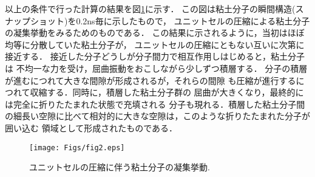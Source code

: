 以上の条件で行った計算の結果を図\ref{fig:fig2}に示す．
この図は粘土分子の瞬間構造(スナップショット)を0.2ns毎に示したもので，
ユニットセルの圧縮による粘土分子の凝集挙動をみるためのものである．
この結果に示されるように，当初はほぼ均等に分散していた粘土分子が，
ユニットセルの圧縮にともない互いに次第に接近する．
接近した分子どうしが分子間力で相互作用しはじめると，粘土分子は
不均一な力を受け，屈曲振動をおこしながら少しずつ積層する．
分子の積層が進むにつれて大きな間隙が形成されるが，それらの間隙
も圧縮が進行するにつれて収縮する．同時に，積層した粘土分子群の
屈曲が大きくなり，最終的には完全に折りたたまれた状態で充填される
分子も現れる．積層した粘土分子間の細長い空隙に比べて相対的に大きな空隙は，このような折りたたまれた分子が囲い込む
領域として形成されたものである．
\begin{figure}[h]
	\begin{center}
	\texttt{[image: Figs/fig2.eps]} 
	\end{center}
	\caption{
		ユニットセルの圧縮に伴う粘土分子の凝集挙動.
	} 
	\label{fig:fig2}
\end{figure}
